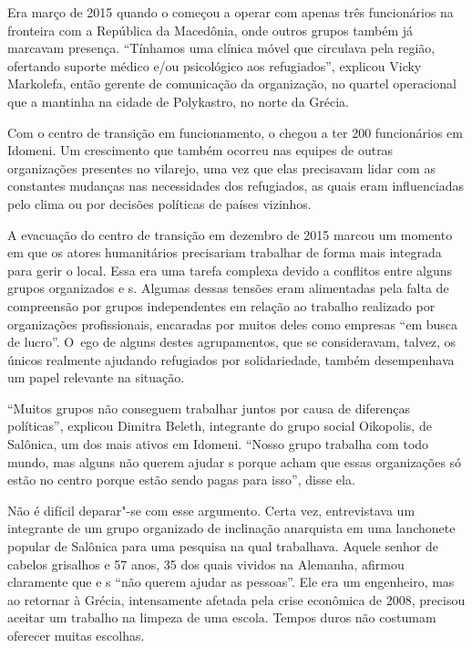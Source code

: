 \clearpage

 

Era março de 2015 quando o  começou a operar com apenas três funcionários na fronteira
com a República da Macedônia, onde outros grupos também já
marcavam  presença. ``Tínhamos uma clínica móvel que circulava pela
região, ofertando suporte médico e/ou psicológico aos refugiados'',
explicou Vicky Markolefa, então gerente de comunicação da organização,
no quartel operacional que a  mantinha na cidade de Polykastro, no
norte da Grécia.

Com o centro de transição em funcionamento, o  chegou a ter 200
funcionários em Idomeni. Um crescimento que também ocorreu nas equipes
de outras organizações presentes no vilarejo, uma vez que elas
precisavam lidar com as constantes mudanças nas necessidades dos
refugiados, as quais eram influenciadas pelo clima ou por decisões
políticas de países vizinhos.

A evacuação do centro de transição em dezembro de 2015 marcou um momento
em que os atores humanitários precisariam trabalhar de forma mais
integrada para gerir o local. Essa era uma tarefa complexa devido a
conflitos entre alguns grupos organizados e s. Algumas dessas tensões
eram alimentadas pela falta de compreensão por grupos independentes em
relação ao trabalho realizado por organizações profissionais, encaradas
por muitos deles como empresas ``em busca de lucro''. O~ego de alguns
destes agrupamentos, que se consideravam, talvez, os únicos realmente
ajudando refugiados por solidariedade, também desempenhava um papel
relevante na situação.

``Muitos grupos não conseguem trabalhar juntos por causa de diferenças
políticas'', explicou Dimitra Beleth, integrante do grupo social
Oikopolis, de Salônica, um dos mais ativos em Idomeni. ``Nosso grupo
trabalha com todo mundo, mas alguns não querem ajudar s porque acham
que essas organizações só estão no centro porque estão sendo pagas para
isso'', disse ela.

Não é difícil deparar"-se com esse argumento. Certa vez, entrevistava um
integrante de um grupo organizado de inclinação anarquista em uma
lanchonete popular de Salônica para uma pesquisa na qual trabalhava.
Aquele senhor de cabelos grisalhos e 57 anos, 35 dos quais vividos na
Alemanha, afirmou claramente que  e s ``não querem ajudar as
pessoas''. Ele era um engenheiro, mas ao retornar à Grécia, intensamente
afetada pela crise econômica de 2008, precisou aceitar um trabalho na
limpeza de uma escola. Tempos duros não costumam oferecer muitas
escolhas.

